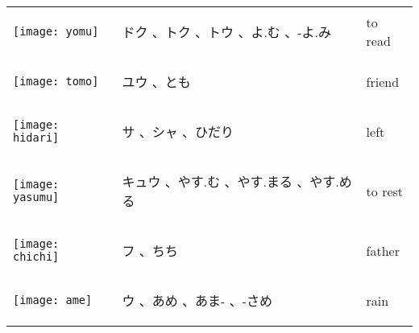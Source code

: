 \documentclass[a4paper,12pt]{extarticle}
\begin{document}
\begin{longtable}{|lp{6cm}p{4cm}|}
\begin{minipage}{0.3\textwidth}
\centerline{
	\texttt{[image: yomu]}
}
\end{minipage}
&
\begin{CJK}{UTF8}{min} ドク 、トク 、トウ 、よ.む 、-よ.み\end{CJK}
&
 to read
\\ 
\begin{minipage}{0.3\textwidth}
\centerline{
	\texttt{[image: tomo]}
}
\end{minipage}
&
\begin{CJK}{UTF8}{min} ユウ 、とも\end{CJK}
&
friend
\\ 
\begin{minipage}{0.3\textwidth}
\centerline{
	\texttt{[image: hidari]}
}
\end{minipage}
&
\begin{CJK}{UTF8}{min} サ 、シャ 、ひだり\end{CJK}
&
 left
\\ 
\begin{minipage}{0.3\textwidth}
\centerline{
	\texttt{[image: yasumu]}
}
\end{minipage}
&
\begin{CJK}{UTF8}{min} キュウ 、やす.む 、やす.まる 、やす.める\end{CJK}
&
 to rest
\\ 
\begin{minipage}{0.3\textwidth}
\centerline{
	\texttt{[image: chichi]}
}
\end{minipage}
&
\begin{CJK}{UTF8}{min}フ 、ちち\end{CJK}
&
 father
\\ 
\begin{minipage}{0.3\textwidth}
\centerline{
	\texttt{[image: ame]}
}
\end{minipage}
&
\begin{CJK}{UTF8}{min} ウ 、あめ 、あま- 、-さめ\end{CJK}
&
 rain
\\ 
\end{longtable}
\end{document}
